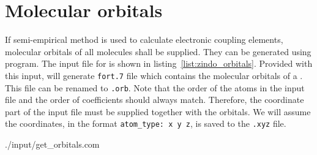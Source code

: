 \section{Molecular orbitals}
If semi-empirical method is used to calculate electronic coupling elements, molecular orbitals of all molecules shall be supplied. They can be generated using \gaussian program. The \gaussian input file for \dcvt is shown in listing~\ref{list:zindo_orbitals}. Provided with this input, \gaussian will generate \texttt{fort.7} file which contains the molecular orbitals of a \dcvt. This file can be renamed to \texttt{\dcvt.orb}. Note that the order of the atoms in the input file and the order of coefficients should always match. Therefore, the coordinate part of the input file must be supplied together with the orbitals. We will assume the coordinates, in the format \texttt{atom\_type: x y z}, is saved to the \texttt{\dcvt.xyz} file.

%
{./input/get_orbitals.com}
%

